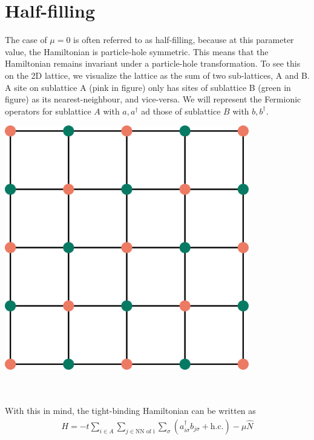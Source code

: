 \documentclass[12pt]{article}
\numberwithin{equation}{section}
\begin{document}
\section*{Half-filling}
\begin{minipage}{0.5\textwidth}
	The case of \(\mu=0\) is often referred to as half-filling, because at this parameter value, the Hamiltonian is particle-hole symmetric. This means that the Hamiltonian remains invariant under a particle-hole transformation. To see this on the 2D lattice, we visualize the lattice as the sum of two sub-lattices, A and B. A site on sublattice A (pink in figure) only has sites of sublattice B (green in figure) as its nearest-neighbour, and vice-versa. We will represent the Fermionic operators for sublattice \(A\) with \(a,a^\dagger\) ad those of sublattice \(B\) with \(b, b^\dagger\).
\end{minipage}
\hspace*{\fill}
\begin{minipage}{0.4\textwidth}
	\centering
	\includegraphics[width=0.8\textwidth]{./sublattice.png}
\end{minipage}
\\\\
With this in mind, the tight-binding Hamiltonian can be written as
\begin{equation}\begin{aligned}
	H = -t\sum_{i \in A}\sum_{j \in \text{NN of i}} \sum_\sigma\left(a^\dagger_{i \sigma}b_{j\sigma} + \text{h.c.}\right) - \mu \hat N
\end{aligned}\end{equation}
\end{document}
